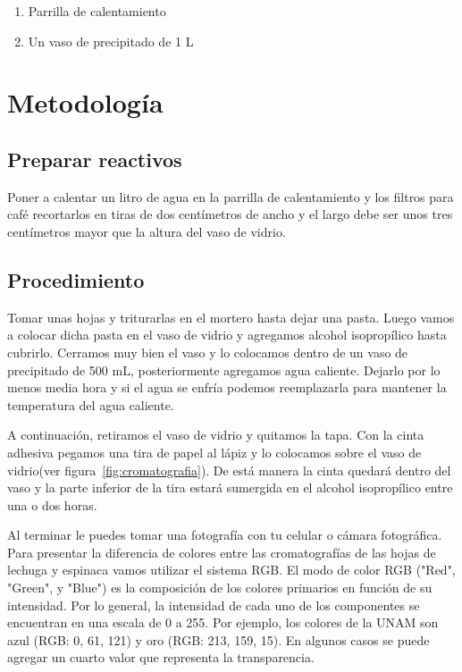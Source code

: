 \begin{enumerate}
	\item Parrilla de calentamiento
	\item Un vaso de precipitado de 1 L
\end{enumerate}

\section{Metodolog\'ia}

\subsection{Preparar reactivos}

Poner a calentar un litro de agua en la parrilla de calentamiento y los filtros para caf\'e recortarlos en tiras de dos cent\'imetros de ancho y el largo debe ser unos tres cent\'imetros mayor que la altura del vaso de vidrio.

\subsection{Procedimiento}

Tomar unas hojas y triturarlas en el mortero hasta dejar una pasta. Luego vamos a colocar dicha pasta en el vaso de vidrio y agregamos alcohol isoprop\'ilico hasta cubrirlo. Cerramos muy bien el vaso y lo colocamos dentro de un vaso de precipitado de 500 mL, posteriormente agregamos agua caliente. Dejarlo por lo menos media hora y si el agua se enfr\'ia podemos reemplazarla para mantener la temperatura del agua caliente.

A continuaci\'on, retiramos el vaso de vidrio y quitamos la tapa. Con la cinta adhesiva pegamos una tira de papel al l\'apiz y lo colocamos sobre el vaso de vidrio(ver figura~\ref{fig:cromatografia}). De est\'a manera la cinta quedar\'a dentro del vaso y la parte inferior de la tira estar\'a sumergida en el alcohol isopropílico entre una o dos horas.

Al terminar le puedes tomar una fotograf\'ia con tu celular o c\'amara fotogr\'afica. Para presentar la diferencia de colores entre las cromatograf\'ias de las hojas de lechuga y espinaca vamos utilizar el sistema RGB. El modo de color RGB ("Red", "Green", y "Blue") es la composici\'on de los colores primarios en funci\'on de su intensidad. Por lo general, la intensidad de cada uno de los componentes se encuentran en una escala de 0 a 255. Por ejemplo, los colores de la UNAM son azul (RGB: 0, 61, 121) y oro (RGB: 213, 159, 15). En algunos casos se puede agregar un cuarto valor que representa la transparencia. 

